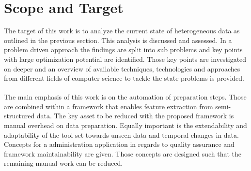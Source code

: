 \section{Scope and Target\label{sec:scope}}
The target of this work is to analyze the current state of heterogeneous data as outlined in the previous section. This analysis is discussed and assessed. In a problem driven approach the findings are split into sub problems and key points with large optimization potential are identified. Those key points are investigated on deeper and an overview of available techniques, technologies and approaches from different fields of computer science to tackle the state problems is provided.
\\\\
The main emphasis of this work is on the automation of preparation steps. Those are combined within a framework that enables feature extraction from semi-structured data. The key asset to be reduced with the proposed framework is manual overhead on data preparation. Equally important is the extendability and adaptability of the tool set towards unseen data and temporal changes in data. Concepts for a administration application in regards to quality assurance and framework maintainability are given. Those concepts are designed such that the remaining manual work can be reduced. 

